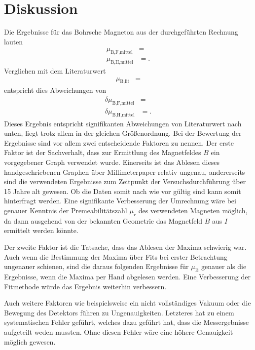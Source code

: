 \section{Diskussion}
\label{sec:Diskussion}

Die Ergebnisse für das Bohrsche Magneton aus der durchgeführten Rechnung lauten
\begin{align*}
  \mu_{\text{B,F,mittel}} &= \\
  \mu_{\text{B,H,mittel}} &= .
\end{align*}
Verglichen mit dem Literaturwert \cite{Konstanten}
\begin{align*}
  \mu_{\text{B,lit}} &= 
\end{align*}
entspricht dies Abweichungen von
\begin{align*}
  \delta \mu_{\text{B,F,mittel}} &= \\
  \delta \mu_{\text{B,H,mittel}} &= .
\end{align*}
Dieses Ergebnis entspricht signifikanten Abweichungen von Literaturwert nach unten, liegt trotz allem in der gleichen Größenordnung.
Bei der Bewertung der Ergebnisse sind vor allem zwei entscheidende Faktoren zu nennen.
Der erste Faktor ist der Sachverhalt, dass zur Ermittlung des Magnetfeldes $B$ ein vorgegebener Graph verwendet wurde.
Einerseits ist das Ablesen dieses handgeschriebenen Graphen über Millimeterpaper relativ ungenau, andererseits sind die verwendeten Ergebnisse zum Zeitpunkt der Versuchsdurchführung über 15 Jahre alt gewesen.
Ob die Daten somit nach wie vor gültig sind kann somit hinterfragt werden.
Eine signifikante Verbesserung der Umrechnung wäre bei genauer Kenntnis der Premeabilitätszahl $\mu_r$ des verwendeten Magneten möglich, da dann ausgehend von der bekannten Geometrie das Magnetfeld $B$ aus $I$ ermittelt werden könnte.

Der zweite Faktor ist die Tatsache, dass das Ablesen der Maxima schwierig war.
Auch wenn die Bestimmung der Maxima über Fits bei erster Betrachtung ungenauer schienen, sind die daraus folgenden Ergebnisse für $\mu_\text{B}$ genauer als die Ergebnisse, wenn die Maxima per Hand abgelesen werden.
Eine Verbesserung der Fitmethode würde das Ergebnis weiterhin verbessern.

Auch weitere Faktoren wie beispielsweise ein nicht vollständiges Vakuum oder die Bewegung des Detektors führen zu Ungenauigkeiten.
Letzteres hat zu einem systematischen Fehler geführt, welches dazu geführt hat, dass die Messergebnisse aufgeteilt weden mussten.
Ohne diesen Fehler wäre eine höhere Genauigkeit möglich gewesen.
